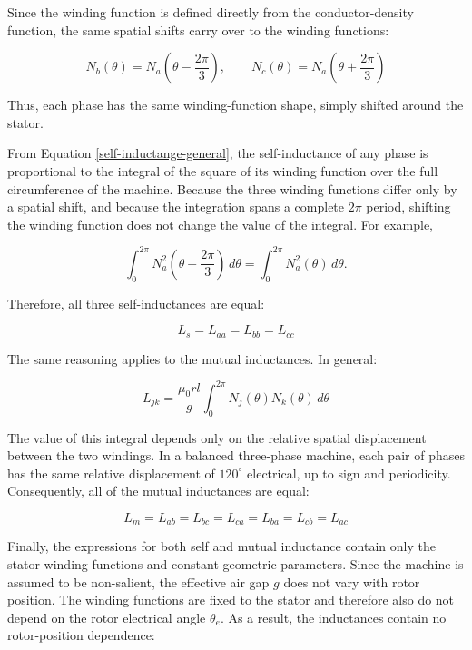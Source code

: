 \documentclass{article}
\begin{document}
Since the winding function is defined directly from the conductor-density function, the same spatial shifts carry over to the winding functions:

\begin{equation}
    N_b(\theta) = N_a\left(\theta - \frac{2\pi}{3}\right), \qquad
    N_c(\theta) = N_a\left(\theta + \frac{2\pi}{3}\right)
\end{equation}

Thus, each phase has the same winding-function shape, simply shifted around the stator.

From Equation \ref{self-inductange-general}, the self-inductance of any phase is proportional to the integral of the square of its winding function over the full circumference of the machine. Because the three winding functions differ only by a spatial shift, and because the integration spans a complete $2\pi$ period, shifting the winding function does not change the value of the integral. For example,

\begin{equation}
\int_0^{2\pi} N_a^2\left(\theta-\frac{2\pi}{3}\right)\,d\theta = \int_0^{2\pi} N_a^2(\theta)\,d\theta.
\end{equation}

Therefore, all three self-inductances are equal:

\begin{equation}
    L_s = L_{aa} = L_{bb} = L_{cc}
\end{equation}

The same reasoning applies to the mutual inductances. In general:

\begin{equation}
    L_{jk} = \frac{\mu_0 r l}{g} \int_0^{2\pi} N_j(\theta)N_k(\theta)\,d\theta
\end{equation}

The value of this integral depends only on the relative spatial displacement between the two windings. In a balanced three-phase machine, each pair of phases has the same relative displacement of $120^\circ$ electrical, up to sign and periodicity. Consequently, all of the mutual inductances are equal:

\begin{equation}
    L_m = L_{ab} = L_{bc} = L_{ca} = L_{ba} = L_{cb} = L_{ac}
\end{equation}

Finally, the expressions for both self and mutual inductance contain only the stator winding functions and constant geometric parameters. Since the machine is assumed to be non-salient, the effective air gap $g$ does not vary with rotor position. The winding functions are fixed to the stator and therefore also do not depend on the rotor electrical angle $\theta_e$. As a result, the inductances contain no rotor-position dependence:
\end{document}
